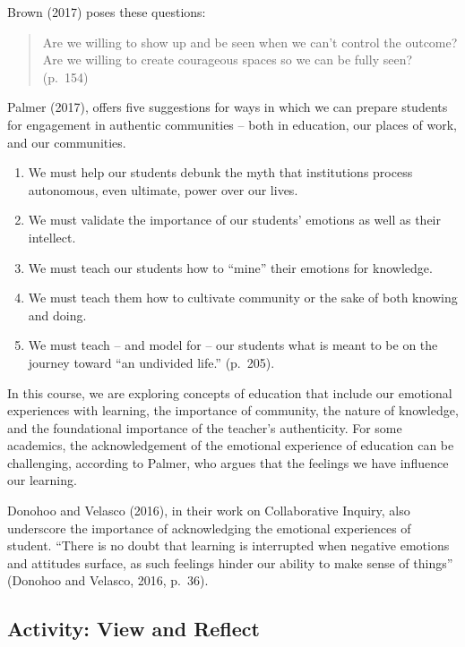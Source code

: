 \documentclass[
]{book}
\providecommand{\tightlist}{%
  \setlength{\itemsep}{0pt}\setlength{\parskip}{0pt}}
\begin{document}
Brown (2017) poses these questions:

\begin{quote}
Are we willing to show up and be seen when we can't control the outcome? Are we willing to create courageous spaces so we can be fully seen? (p.~154)
\end{quote}

Palmer (2017), offers five suggestions for ways in which we can prepare students for engagement in authentic communities -- both in education, our places of work, and our communities.

\begin{enumerate}
\def\labelenumi{\arabic{enumi}.}
\tightlist
\item
  We must help our students debunk the myth that institutions process autonomous, even ultimate, power over our lives.
\item
  We must validate the importance of our students' emotions as well as their intellect.
\item
  We must teach our students how to ``mine'' their emotions for knowledge.
\item
  We must teach them how to cultivate community or the sake of both knowing and doing.
\item
  We must teach -- and model for -- our students what is meant to be on the journey toward ``an undivided life.'' (p.~205).
\end{enumerate}

In this course, we are exploring concepts of education that include our emotional experiences with learning, the importance of community, the nature of knowledge, and the foundational importance of the teacher's authenticity. For some academics, the acknowledgement of the emotional experience of education can be challenging, according to Palmer, who argues that the feelings we have influence our learning.

Donohoo and Velasco (2016), in their work on Collaborative Inquiry, also underscore the importance of acknowledging the emotional experiences of student. ``There is no doubt that learning is interrupted when negative emotions and attitudes surface, as such feelings hinder our ability to make sense of things'' (Donohoo and Velasco, 2016, p.~36).

\hypertarget{activity-view-and-reflect-1}{%
\subsection{Activity: View and Reflect}\label{activity-view-and-reflect-1}}
\end{document}
